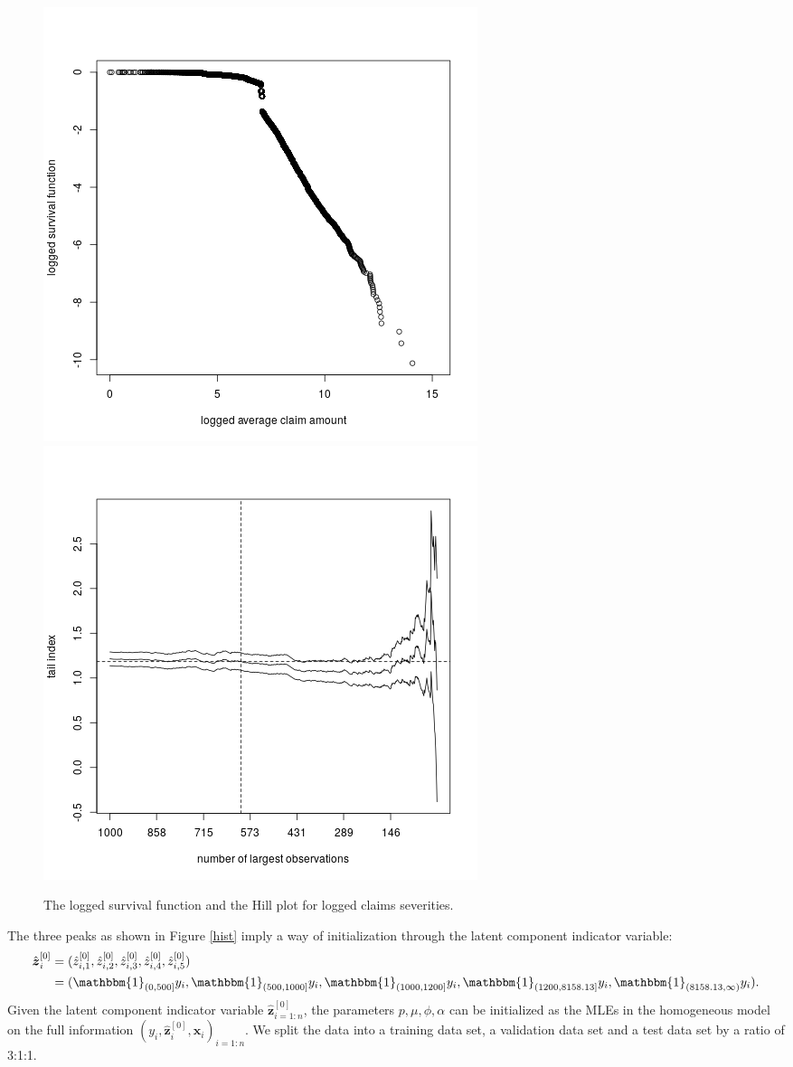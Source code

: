 \documentclass[11pt]{article}
\numberwithin{equation}{section}
\def\bx{\boldsymbol{x}}
\def\bz{\boldsymbol{z}}
\begin{document}
	
\begin{figure}[h!]
	\centering
	\includegraphics[width=0.4\linewidth]{../plots/sev/log-log.png}
	\includegraphics[width=0.4\linewidth]{../plots/sev/hill.png}
	\caption{The logged survival function and the Hill plot for logged claims severities.}\label{tail}
\end{figure}
	
	The three peaks as shown in Figure \ref{hist} imply a way of initialization through the latent component indicator variable:
	\begin{equation}
		\begin{aligned}
			\hat{\bz}^{[0]}_i&=(\hat{z}^{[0]}_{i,1},\hat{z}^{[0]}_{i,2},\hat{z}^{[0]}_{i,3},\hat{z}^{[0]}_{i,4},\hat{z}^{[0]}_{i,5})\\
			&=(\mathbbm{1}_{(0,500]}y_i,\mathbbm{1}_{(500, 1000]}y_i,\mathbbm{1}_{(1000,1200]}y_i,\mathbbm{1}_{(1200,8158.13]}y_i,\mathbbm{1}_{(8158.13,\infty)}y_i).
		\end{aligned}
	\end{equation}
Given the latent component indicator variable $\hat{\bz}^{[0]}_{i=1:n}$, the parameters $p,\mu,\phi,\alpha$ can be initialized as the MLEs in the homogeneous model on the full information $(y_i,\hat{\bz}_i^{[0]},\bx_i)_{i=1:n}$.
We split the data into a training data set, a validation data set and a test data set by a ratio of 3:1:1. 
	
\end{document}
